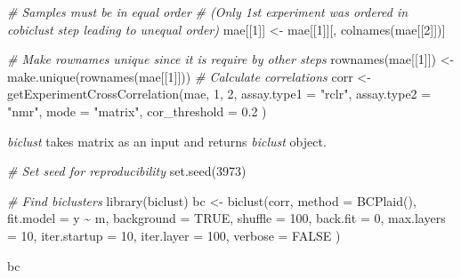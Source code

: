 \documentclass[
]{book}
\newenvironment{Shaded}{\begin{snugshade}}{\end{snugshade}}
\newcommand{\AttributeTok}[1]{\textcolor[rgb]{0.77,0.63,0.00}{#1}}
\newcommand{\CommentTok}[1]{\textcolor[rgb]{0.56,0.35,0.01}{\textit{#1}}}
\newcommand{\ConstantTok}[1]{\textcolor[rgb]{0.00,0.00,0.00}{#1}}
\newcommand{\DecValTok}[1]{\textcolor[rgb]{0.00,0.00,0.81}{#1}}
\newcommand{\FloatTok}[1]{\textcolor[rgb]{0.00,0.00,0.81}{#1}}
\newcommand{\FunctionTok}[1]{\textcolor[rgb]{0.00,0.00,0.00}{#1}}
\newcommand{\NormalTok}[1]{#1}
\newcommand{\OtherTok}[1]{\textcolor[rgb]{0.56,0.35,0.01}{#1}}
\newcommand{\SpecialCharTok}[1]{\textcolor[rgb]{0.00,0.00,0.00}{#1}}
\newcommand{\StringTok}[1]{\textcolor[rgb]{0.31,0.60,0.02}{#1}}
\begin{document}
\begin{Shaded}
\begin{Highlighting}[]
\CommentTok{\# Samples must be in equal order}
\CommentTok{\# (Only 1st experiment  was ordered in cobiclust step leading to unequal order)}
\NormalTok{mae[[}\DecValTok{1}\NormalTok{]] }\OtherTok{\textless{}{-}}\NormalTok{ mae[[}\DecValTok{1}\NormalTok{]][, }\FunctionTok{colnames}\NormalTok{(mae[[}\DecValTok{2}\NormalTok{]])]}

\CommentTok{\# Make rownames unique since it is require by other steps}
\FunctionTok{rownames}\NormalTok{(mae[[}\DecValTok{1}\NormalTok{]]) }\OtherTok{\textless{}{-}} \FunctionTok{make.unique}\NormalTok{(}\FunctionTok{rownames}\NormalTok{(mae[[}\DecValTok{1}\NormalTok{]]))}
\CommentTok{\# Calculate correlations}
\NormalTok{corr }\OtherTok{\textless{}{-}} \FunctionTok{getExperimentCrossCorrelation}\NormalTok{(mae, }\DecValTok{1}\NormalTok{, }\DecValTok{2}\NormalTok{,}
  \AttributeTok{assay.type1 =} \StringTok{"rclr"}\NormalTok{,}
  \AttributeTok{assay.type2 =} \StringTok{"nmr"}\NormalTok{,}
  \AttributeTok{mode =} \StringTok{"matrix"}\NormalTok{,}
  \AttributeTok{cor\_threshold =} \FloatTok{0.2}
\NormalTok{)}
\end{Highlighting}
\end{Shaded}

\emph{biclust} takes matrix as an input and returns \emph{biclust} object.

\begin{Shaded}
\begin{Highlighting}[]
\CommentTok{\# Set seed for reproducibility}
\FunctionTok{set.seed}\NormalTok{(}\DecValTok{3973}\NormalTok{)}

\CommentTok{\# Find biclusters}
\FunctionTok{library}\NormalTok{(biclust)}
\NormalTok{bc }\OtherTok{\textless{}{-}} \FunctionTok{biclust}\NormalTok{(corr,}
  \AttributeTok{method =} \FunctionTok{BCPlaid}\NormalTok{(), }\AttributeTok{fit.model =}\NormalTok{ y }\SpecialCharTok{\textasciitilde{}}\NormalTok{ m,}
  \AttributeTok{background =} \ConstantTok{TRUE}\NormalTok{, }\AttributeTok{shuffle =} \DecValTok{100}\NormalTok{, }\AttributeTok{back.fit =} \DecValTok{0}\NormalTok{, }\AttributeTok{max.layers =} \DecValTok{10}\NormalTok{,}
  \AttributeTok{iter.startup =} \DecValTok{10}\NormalTok{, }\AttributeTok{iter.layer =} \DecValTok{100}\NormalTok{, }\AttributeTok{verbose =} \ConstantTok{FALSE}
\NormalTok{)}

\NormalTok{bc}
\end{Highlighting}
\end{Shaded}
\end{document}
